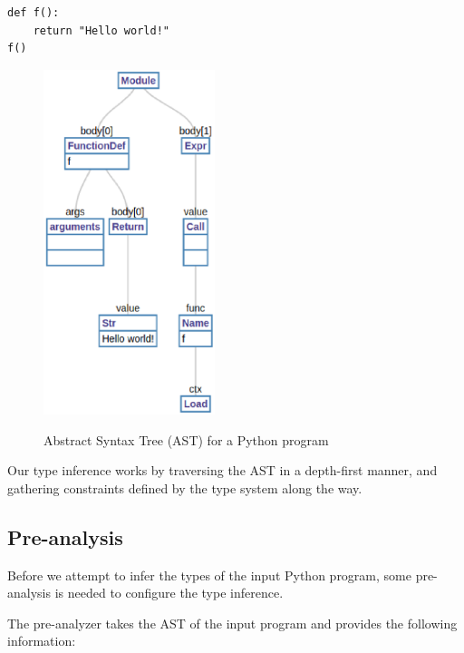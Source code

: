 \begin{lstlisting}
def f():
	return "Hello world!"
f()
\end{lstlisting}
\begin{figure}
	\begin{mdframed}
		\centering
		\includegraphics[width=50mm]{images/ast.eps}\\
	\end{mdframed}
	\caption{Abstract Syntax Tree (AST) for a Python program}
	\label{fig:ast}
\end{figure}

Our type inference works by traversing the AST in a depth-first manner, and gathering constraints defined by the type system along the way.
\subsection{Pre-analysis}\label{pre}
Before we attempt to infer the types of the input Python program, some pre-analysis is needed to configure the type inference.

The pre-analyzer takes the AST of the input program and provides the following information:

